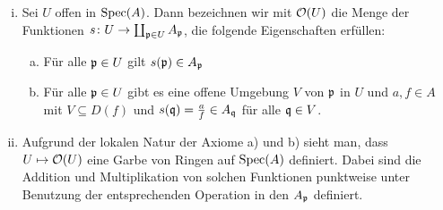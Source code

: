 \begin{kons}
\label{kons:4.11}
	\begin{enumerate}[i)]
		\item Sei $U$ offen in $\operatorname{Spec}(A)$. Dann bezeichnen wir mit $\mathcal{O}(U)$ die Menge der Funktionen $s\colon U \to \coprod_{\mathfrak{p} \in U}A_{\mathfrak{p}}$, die folgende Eigenschaften erfüllen:
		\begin{enumerate}[a)]
			\item\label{kons:4.11:a} Für alle $\mathfrak{p} \in U$ gilt $s(\mathfrak{p}) \in A_{\mathfrak{p}}$
			\item\label{kons:4.11:b} Für alle $\mathfrak{p} \in U$ gibt es eine offene Umgebung $V$ von $\mathfrak{p}$ in $U$ und $a,f\in A$ mit $V \subseteq D(f)$ und $s(\mathfrak{q}) =  \frac{a}{f} \in A_{\mathfrak{q}}$ für alle $\mathfrak{q} \in V$.
		\end{enumerate}
		\item Aufgrund der lokalen Natur der Axiome a) und b) sieht man, dass $U \mapsto \mathcal{O}(U)$ eine Garbe von Ringen auf $\operatorname{Spec}(A)$ definiert. Dabei sind die Addition und Multiplikation von solchen Funktionen punktweise unter Benutzung der entsprechenden Operation in den $A_{\mathfrak{p}}$ definiert.
	\end{enumerate}
\end{kons}

